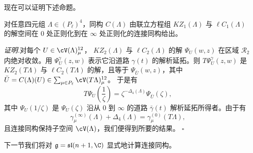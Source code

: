 
现在可以证明下述命题。

\begin{proposition}[6.20]
对任意四元组 $\Lambda\in(P_\ell)^4$，同构 $C(\Lambda)$ 由联立方程组
$KZ_1(\Lambda)$ 与 $\ell C_1(\Lambda)$ 的解空间在 $0$ 处正则化到在
$\infty$ 处正则化的连接同构给出。
\end{proposition}

\noindent\textit{证明.}\quad 对每个 $U\in\cV(\Lambda)^{12}_{\mu}$，
$KZ_2(\Lambda)$ 与 $\ell C_2(\Lambda)$ 的解 $\Psi_U(w,z)$ 在区域
$\mathcal{R}_2$ 内绝对收敛。用 $\Psi^{\gamma}_U(z,w)$ 表示它沿道路
$\gamma(t)$ 的解析延拓。则 $T\Psi^{\gamma}_U(z,w)$ 是 $KZ_2(T\Lambda)$ 与
$\ell C_2(T\Lambda)$ 的解，且等于 $\Psi_{\bar U}(w,z)$，其中
$\bar U=C(\Lambda)(U)\in\sum_{\mu\in P_\ell}\cV(T\Lambda)^{12}_{\mu}$。
于是有
\[
T\Psi_U\left(\frac{1}{\zeta}\right)
=\zeta^{-\Delta_4(\Lambda)}\Psi_{\bar U}(\zeta),
\]
其中 $\Psi_U(1/\zeta)$ 是 $\Psi_U(\zeta)$ 沿从 $0$ 到 $\infty$ 的道路
$\bar{\gamma}(t)$ 解析延拓所得者。由于有
\[
\gamma^{(\infty)}_{\mu}(\Lambda)+\Delta_4(\Lambda)
=\gamma^{(0)}_{\mu}(T\Lambda),
\]
且连接同构保持子空间 $\cV(\Lambda)$，我们便得到所要的结果。
\hfill$\square$

下一节我们将对 $\mathfrak{g}=\mathfrak{sl}(n+1,\C)$ 显式地计算连接同构。
